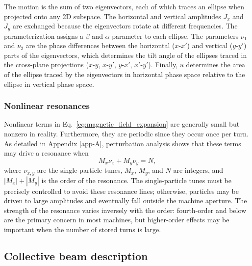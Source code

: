 %
The motion is the sum of two eigenvectors, each of which traces an ellipse when projected onto any 2D subspace. The horizontal and vertical amplitudes $J_x$ and $J_y$ are exchanged because the eigenvectors rotate at different frequencies. The parameterization assigns a $\beta$ and $\alpha$ parameter to each ellipse. The parameters $\nu_1$ and $\nu_2$ are the phase differences between the horizontal ($x$-$x'$) and vertical ($y$-$y'$) parts of the eigenvectors, which determines the tilt angle of the ellipses traced in the cross-plane projections ($x$-$y$, $x$-$y'$, $y$-$x'$, $x'$-$y'$). Finally, $u$ determines the area of the ellipse traced by the eigenvectors in horizontal phase space relative to the ellipse in vertical phase space. 


\subsubsection{Nonlinear resonances}

Nonlinear terms in Eq.~\eqref{eq:magnetic_field_expansion} are generally small but nonzero in reality. Furthermore, they are periodic since they occur once per turn. As detailed in Appendix \ref{app-A}, perturbation analysis shows that these terms may drive a resonance when 
%
\begin{equation}\label{eq:resonance_lines}
    M_x \nu_x + M_y \nu_y = N,
\end{equation}
%
where $\nu_{x, y}$ are the single-particle tunes, $M_x$, $M_y$, and $N$ are integers, and $|M_x| + |M_y|$ is the order of the resonance. The single-particle tunes must be precisely controlled to avoid these resonance lines; otherwise, particles may be driven to large amplitudes and eventually fall outside the machine aperture. The strength of the resonance varies inversely with the order: fourth-order and below are the primary concern in most machines, but higher-order effects may be important when the number of stored turns is large. 



\subsection{Collective beam description}

